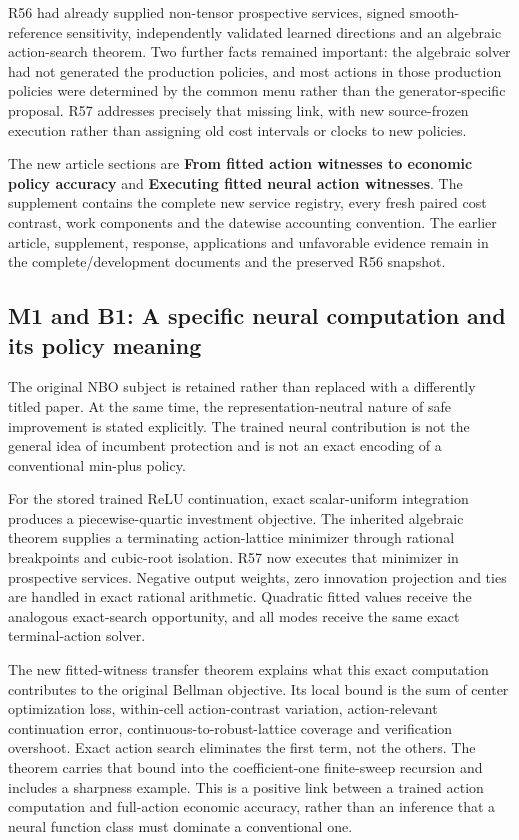 \documentclass[ecta,nameyear,draft]{econsocart}
\begin{document}
R56 had already supplied non-tensor prospective services, signed
smooth-reference sensitivity, independently validated learned directions
and an algebraic action-search theorem. Two further facts remained
important: the algebraic solver had not generated the production
policies, and most actions in those production policies were determined
by the common menu rather than the generator-specific proposal. R57
addresses precisely that missing link, with new source-frozen execution
rather than assigning old cost intervals or clocks to new policies.

The new article sections are \textbf{From fitted action witnesses to
economic policy accuracy} and \textbf{Executing fitted neural action
witnesses}. The supplement contains the complete new service registry,
every fresh paired cost contrast, work components and the datewise
accounting convention. The earlier article, supplement, response,
applications and unfavorable evidence remain in the complete/development
documents and the preserved R56 snapshot.

\hypertarget{m1-and-b1-a-specific-neural-computation-and-its-policy-meaning}{%
\subsection{M1 and B1: A specific neural computation and its policy
meaning}\label{m1-and-b1-a-specific-neural-computation-and-its-policy-meaning}}

The original NBO subject is retained rather than replaced with a
differently titled paper. At the same time, the representation-neutral
nature of safe improvement is stated explicitly. The trained neural
contribution is not the general idea of incumbent protection and is not
an exact encoding of a conventional min-plus policy.

For the stored trained ReLU continuation, exact scalar-uniform
integration produces a piecewise-quartic investment objective. The
inherited algebraic theorem supplies a terminating action-lattice
minimizer through rational breakpoints and cubic-root isolation. R57 now
executes that minimizer in prospective services. Negative output
weights, zero innovation projection and ties are handled in exact
rational arithmetic. Quadratic fitted values receive the analogous
exact-search opportunity, and all modes receive the same exact
terminal-action solver.

The new fitted-witness transfer theorem explains what this exact
computation contributes to the original Bellman objective. Its local
bound is the sum of center optimization loss, within-cell
action-contrast variation, action-relevant continuation error,
continuous-to-robust-lattice coverage and verification overshoot. Exact
action search eliminates the first term, not the others. The theorem
carries that bound into the coefficient-one finite-sweep recursion and
includes a sharpness example. This is a positive link between a trained
action computation and full-action economic accuracy, rather than an
inference that a neural function class must dominate a conventional one.
\end{document}
